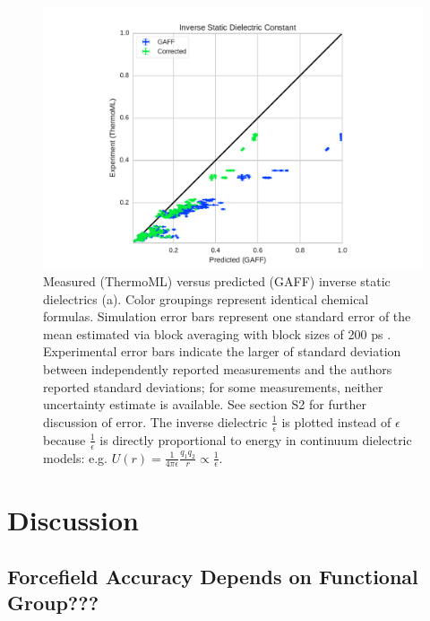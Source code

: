 \documentclass[journal=jacsat,manuscript=article]{achemso}
\begin{document}
\begin{figure}
\includegraphics[width=\columnwidth]{./figures/dielectrics_thermoml.pdf}

\caption{Measured (ThermoML) versus predicted (GAFF) inverse static dielectrics (a).  Color groupings represent identical chemical formulas.  Simulation error bars represent one standard error of the mean estimated via block averaging with block sizes of 200 ps \cite{flyvbjerg1989error}.  Experimental error bars indicate the larger of standard deviation between independently reported measurements and the authors reported standard deviations; for some measurements, neither uncertainty estimate is available.  See section S2 for further discussion of error.  The inverse dielectric $\frac{1}{\epsilon}$ is plotted instead of $\epsilon$ because $\frac{1}{\epsilon}$ is directly proportional to energy in continuum dielectric models: e.g. $U(r) = \frac{1}{4 \pi \epsilon} \frac{q_1 q_2}{r} \propto \frac{1}{\epsilon}$.
}
\label{figure:Dielectric}
\end{figure}

\section{Discussion}

\subsection{Forcefield Accuracy Depends on Functional Group???}
\end{document}
